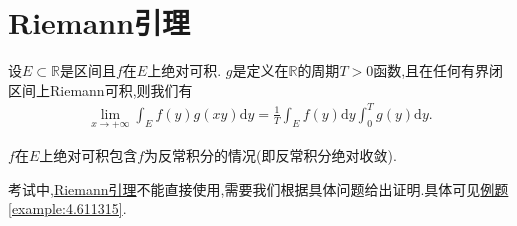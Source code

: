 \documentclass[../../main.tex]{subfiles}
\begin{document}
\section{Riemann引理}

\begin{theorem}[Riemann引理]\label{theorem:Riemann引理}
设\(E\subset\mathbb{R}\)是区间且\(f\)在\(E\)上绝对可积. \(g\)是定义在\(\mathbb{R}\)的周期\(T > 0\)函数,且在任何有界闭区间上Riemann可积,则我们有
\begin{align}\label{equation:4.1-1.1}
\lim_{x\rightarrow +\infty}\int_{E}f(y)g(xy)\mathrm{d}y=\frac{1}{T}\int_{E}f(y)\mathrm{d}y\int_{0}^{T}g(y)\mathrm{d}y.
\end{align}
\end{theorem}
\begin{remark}
\(f\)在\(E\)上绝对可积包含$f$为反常积分的情况(即反常积分绝对收敛).

考试中,\hyperref[theorem:Riemann引理]{Riemann引理}不能直接使用,需要我们根据具体问题给出证明.具体可见\hyperref[example:4.611315]{例题\ref{example:4.611315}}.
\end{remark}
\end{document}
